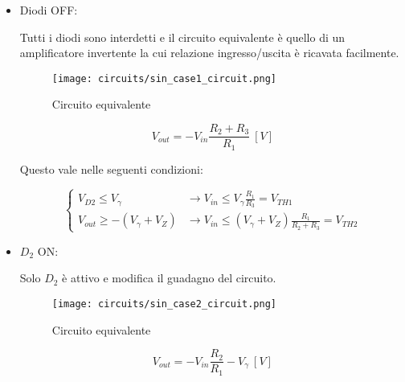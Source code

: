 \begin{itemize}
    \item Diodi OFF:

          Tutti i diodi sono interdetti e il circuito equivalente è quello di un amplificatore invertente
          la cui relazione ingresso/uscita è ricavata facilmente.

          \begin{minipage}{0.45\textwidth}
              \centering
              \begin{figure}[H]
                  \centering
                  \texttt{[image: circuits/sin\_case1\_circuit.png]}
                  \caption{Circuito equivalente}
                  \label{sin_case1_circuit}
              \end{figure}
          \end{minipage}
          \begin{minipage}{0.45\textwidth}
              \centering
              \begin{equation}
                  V_{out}=-V_{in}\frac{R_2+R_3}{R_1}\ [V]
              \end{equation}
          \end{minipage}

          Questo vale nelle seguenti condizioni:

          \begin{equation}
              \left\{
              \begin{array}{ll}
                  V_{D2}\leq V_{\gamma}        & \rightarrow V_{in}\leq V_{\gamma}\frac{R_1}{R_3}=V_{TH1}          \\
                  V_{out}\geq-(V_{\gamma}+V_Z) & \rightarrow V_{in}\leq(V_{\gamma}+V_Z)\frac{R_1}{R_2+R_3}=V_{TH2}
              \end{array}
              \right.
          \end{equation}

    \item $D_2$ ON:

          Solo $D_2$ è attivo e modifica il guadagno del circuito.

          \begin{minipage}{0.45\textwidth}
              \centering
              \begin{figure}[H]
                  \centering
                  \texttt{[image: circuits/sin\_case2\_circuit.png]}
                  \caption{Circuito equivalente}
                  \label{sin_case2_circuit}
              \end{figure}
          \end{minipage}
          \begin{minipage}{0.45\textwidth}
              \centering
              \begin{equation}
                  V_{out}=-V_{in}\frac{R_2}{R_1}-V_\gamma\ [V]
              \end{equation}
          \end{minipage}


\end{itemize}
